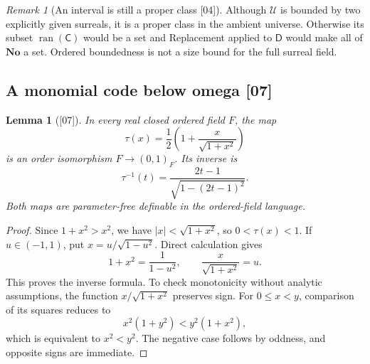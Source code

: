 \documentclass[11pt,a4paper]{article}
\numberwithin{equation}{section}
\newtheorem{lemma}[lemma]{Lemma}
\theoremstyle{definition}
\theoremstyle{remark}
\newtheorem{remark}[remark]{Remark}
\newcommand{\No}{\mathbf{No}}
\newcommand{\ran}{\operatorname{ran}}
\newcommand{\Code}{\mathsf C}
\newcommand{\Decode}{\mathsf D}
\newcommand{\Cell}{\mathcal U}
\newcommand{\src}[1]{\textup{\textsf{\small[#1]}}}
\begin{document}
\begin{remark}[An interval is still a proper class \src{04}]
Although $\Cell$ is bounded by two explicitly given surreals, it is a
proper class in the ambient universe. Otherwise its subset
$\ran(\Code)$ would be a set and Replacement applied to $\Decode$
would make all of $\No$ a set. Ordered boundedness is not a size bound
for the full surreal field.
\end{remark}

\subsection{A monomial code below omega \src{07}}

\begin{lemma}[\src{07}]\label{dsn:lem:tau}
In every real closed ordered field $F$, the map
\[
 \tau(x)=\frac12\left(1+\frac{x}{\sqrt{1+x^2}}\right)
\]
is an order isomorphism $F\to(0,1)_F$. Its inverse is
\begin{equation}\label{dsn:eq:tauinv}
 \tau^{-1}(t)=\frac{2t-1}{\sqrt{1-(2t-1)^2}}.
\end{equation}
Both maps are parameter-free definable in the ordered-field language.
\end{lemma}
\begin{proof}
Since $1+x^2>x^2$, we have $|x|<\sqrt{1+x^2}$, so $0<\tau(x)<1$. If
$u\in(-1,1)$, put $x=u/\sqrt{1-u^2}$. Direct calculation gives
\[
 1+x^2=\frac1{1-u^2},\qquad
 \frac{x}{\sqrt{1+x^2}}=u.
\]
This proves the inverse formula. To check monotonicity without analytic
assumptions, the function $x/\sqrt{1+x^2}$ preserves sign. For $0\le x<y$,
comparison of its squares reduces to
\[
 x^2(1+y^2)<y^2(1+x^2),
\]
which is equivalent to $x^2<y^2$. The negative case follows by oddness, and
opposite signs are immediate.
\end{proof}
\end{document}
